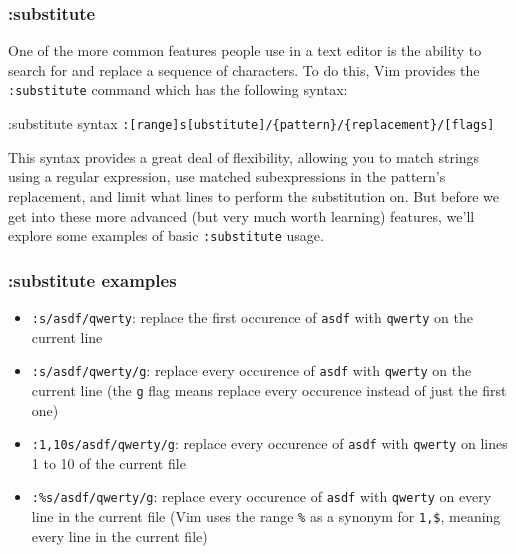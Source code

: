 \documentclass{beamer}
\begin{document}
\begin{frame}[fragile]
    \frametitle{:substitute}
    \small
    One of the more common features people use in a text editor is the ability to search for and replace a sequence of characters. To do this, Vim provides the \verb+:substitute+ command which has the following syntax:
    \vspace{0.5cm}
    \begin{block}{:substitute syntax}
	\verb+:[range]s[ubstitute]/{pattern}/{replacement}/[flags]+
    \end{block}
    \vspace{0.5cm}
    This syntax provides a great deal of flexibility, allowing you to match strings using a regular expression, use matched subexpressions in the pattern's replacement, and limit what lines to perform the substitution on. But before we get into these more advanced (but very much worth learning) features, we'll explore some examples of basic \verb+:substitute+ usage.
\end{frame}

\begin{frame}[fragile]
    \frametitle{:substitute examples}
    \small
    \begin{itemize}
	\item \verb+:s/asdf/qwerty+: replace the first occurence of \verb+asdf+ with \verb+qwerty+ on the current line
	\item \verb+:s/asdf/qwerty/g+: replace every occurence of \verb+asdf+ with \verb+qwerty+ on the current line (the \verb+g+ flag means replace every occurence instead of just the first one)
	\item \verb+:1,10s/asdf/qwerty/g+: replace every occurence of \verb+asdf+ with \verb+qwerty+ on lines 1 to 10 of the current file
	\item \verb+:%s/asdf/qwerty/g+: replace every occurence of \verb+asdf+ with \verb+qwerty+ on every line in the current file (Vim uses the range \verb+%+ as a synonym for \verb+1,$+, meaning every line in the current file)
    \end{itemize}
\end{frame}
\end{document}
